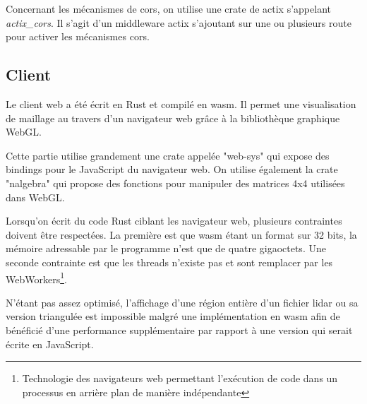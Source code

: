 Concernant les mécanismes de \gls{cors}, on utilise une crate de actix
s'appelant \textit{actix_cors}.
Il s'agit d'un middleware actix s'ajoutant sur une ou plusieurs route pour
activer les mécanismes \gls{cors}.

\subsection{Client}

Le client web a été écrit en Rust et compilé en \gls{wasm}.
Il permet une visualisation de maillage au travers d'un navigateur web grâce à
la bibliothèque graphique WebGL.

Cette partie utilise grandement une crate appelée "web-sys" qui expose des bindings pour le JavaScript du navigateur web.
On utilise également la crate "nalgebra" qui propose des fonctions pour manipuler des matrices 4x4 utilisées dans WebGL.

Lorsqu'on écrit du code Rust ciblant les navigateur web, plusieurs contraintes
doivent être respectées. La première est que \gls{wasm} étant un format sur 32
bits, la mémoire adressable par le programme n'est que de quatre gigaoctets. Une
seconde contrainte est que les threads n'existe pas et sont remplacer par les
WebWorkers\footnote{Technologie des navigateurs web permettant l'exécution de
code dans un processus en arrière plan de manière indépendante}.

N'étant pas assez optimisé, l'affichage d'une région entière d'un fichier \gls{lidar} ou sa version triangulée est impossible malgré une implémentation en \gls{wasm} afin de bénéficié d'une performance supplémentaire par rapport à une version qui serait écrite en JavaScript.

